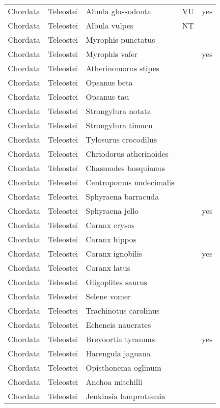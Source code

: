 \begin{longtable}{lllll}
  Chordata & Teleostei & Albula glossodonta & VU & yes \\ 
  Chordata & Teleostei & Albula vulpes & NT &  \\ 
  Chordata & Teleostei & Myrophis punctatus &  &  \\ 
  Chordata & Teleostei & Myrophis vafer &  & yes \\ 
  Chordata & Teleostei & Atherinomorus stipes &  &  \\ 
  Chordata & Teleostei & Opsanus beta &  &  \\ 
  Chordata & Teleostei & Opsanus tau &  &  \\ 
  Chordata & Teleostei & Strongylura notata &  &  \\ 
  Chordata & Teleostei & Strongylura timucu &  &  \\ 
  Chordata & Teleostei & Tylosurus crocodilus &  &  \\ 
  Chordata & Teleostei & Chriodorus atherinoides &  &  \\ 
  Chordata & Teleostei & Chasmodes bosquianus &  &  \\ 
  Chordata & Teleostei & Centropomus undecimalis &  &  \\ 
  Chordata & Teleostei & Sphyraena barracuda &  &  \\ 
  Chordata & Teleostei & Sphyraena jello &  & yes \\ 
  Chordata & Teleostei & Caranx crysos &  &  \\ 
  Chordata & Teleostei & Caranx hippos &  &  \\ 
  Chordata & Teleostei & Caranx ignobilis &  & yes \\ 
  Chordata & Teleostei & Caranx latus &  &  \\ 
  Chordata & Teleostei & Oligoplites saurus &  &  \\ 
  Chordata & Teleostei & Selene vomer &  &  \\ 
  Chordata & Teleostei & Trachinotus carolinus &  &  \\ 
  Chordata & Teleostei & Echeneis naucrates &  &  \\ 
  Chordata & Teleostei & Brevoortia tyrannus &  & yes \\ 
  Chordata & Teleostei & Harengula jaguana &  &  \\ 
  Chordata & Teleostei & Opisthonema oglinum &  &  \\ 
  Chordata & Teleostei & Anchoa mitchilli &  &  \\ 
  Chordata & Teleostei & Jenkinsia lamprotaenia &  &  \\ 

\end{longtable}
